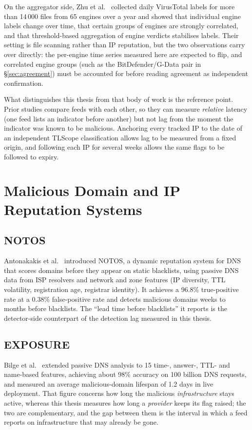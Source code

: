 On the aggregator side, Zhu et al.\ \cite{zhu2020labeldynamics} collected daily VirusTotal labels
for more than 14\,000 files from 65 engines over a year and showed that individual engine labels
change over time, that certain groups of engines are strongly correlated, and that threshold-based
aggregation of engine verdicts stabilises labels. Their setting is file scanning rather than IP
reputation, but the two observations carry over directly: the per-engine time series measured here
are expected to flip, and correlated engine groups (such as the BitDefender/G-Data pair in
\S\ref{sec:agreement}) must be accounted for before reading agreement as independent confirmation.

What distinguishes this thesis from that body of work is the reference point. Prior studies compare
feeds with each other, so they can measure \emph{relative} latency (one feed lists an indicator
before another) but not lag from the moment the indicator was known to be malicious. Anchoring every
tracked IP to the date of an independent TLScope classification allows lag to be measured from a
fixed origin, and following each IP for several weeks allows the same flags to be followed to
expiry.

\section{Malicious Domain and IP Reputation Systems}

\subsection{NOTOS}

Antonakakis et al.\ \cite{antonakakis2010notos} introduced NOTOS, a dynamic reputation system for
DNS that scores domains before they appear on static blacklists, using passive DNS data from ISP
resolvers and network and zone features (IP diversity, TTL volatility, registration age, registrar
identity). It achieves a 96.8\% true-positive rate at a 0.38\% false-positive rate and detects
malicious domains weeks to months before blacklists. The ``lead time before blacklists'' it reports
is the detector-side counterpart of the detection lag measured in this thesis.

\subsection{EXPOSURE}

Bilge et al.\ \cite{bilge2011exposure} extended passive DNS analysis to 15 time-, answer-, TTL- and
name-based features, achieving about 98\% accuracy on 100 billion DNS requests, and measured an
average malicious-domain lifespan of 1.2 days in live deployment. That figure concerns how long the
malicious \emph{infrastructure} stays active, whereas this thesis measures how long a \emph{provider}
keeps its flag raised; the two are complementary, and the gap between them is the interval in which
a feed reports on infrastructure that may already be gone.

